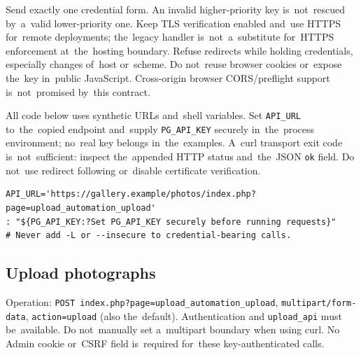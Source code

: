 \documentclass[11pt,a4paper]{article}
\newcommand{\codeword}[1]{\nolinkurl{#1}}
\begin{document}
Send exactly one credential form. An invalid higher-priority key is~not~rescued by~a~valid
lower-priority one. Keep TLS verification enabled and~use HTTPS for~remote deployments;
the~legacy handler is~not~a~substitute for~HTTPS enforcement at~the~hosting boundary. Refuse
redirects while holding credentials, especially changes of~host or~scheme. Do not~reuse
browser cookies or~expose the~key in~public JavaScript. Cross-origin browser CORS/preflight
support is~not~promised by~this contract.

All code below uses synthetic URLs and~shell variables. Set \codeword{API_URL} to~the~copied
endpoint and~supply \codeword{PG_API_KEY} securely in~the~process environment; no~real key
belongs in~the~examples. A~curl transport exit code is~not~sufficient: inspect the~appended
HTTP status and~the~JSON \codeword{ok} field. Do not~use redirect following or~disable
certificate verification.

\begin{lstlisting}[language={}]
API_URL='https://gallery.example/photos/index.php?page=upload_automation_upload'
: "${PG_API_KEY:?Set PG_API_KEY securely before running requests}"
# Never add -L or --insecure to credential-bearing calls.
\end{lstlisting}

\subsection{\texorpdfstring{Upload photographs}{Upload photographs}}

\label{api352:upload}

Operation: \codeword{POST index.php?page=upload_automation_upload},
\codeword{multipart/form-data}, \codeword{action=upload} (also the~default). Authentication
and \codeword{upload_api} must be~available. Do not~manually set a~multipart boundary when
using curl. No Admin cookie or~CSRF field is~required for~these key-authenticated calls.
\end{document}
